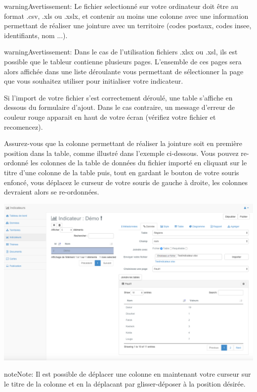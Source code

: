 \documentclass[letterpaper,10pt,french]{sphinxmanual}
\begin{document}
\begin{notice}{warning}{Avertissement:}
Le fichier selectionné sur votre ordinateur doit être au format
.csv, .xls ou .xslx, et contenir au moins une colonne avec une
information permettant de réaliser une jointure avec un territoire
(codes postaux, codes insee, identifiants, nom ...).
\end{notice}

\begin{notice}{warning}{Avertissement:}
Dans le cas de l'utilisation fichiers .xlsx ou .xsl, ils est
possible que le tableur contienne plusieurs pages. L'ensemble de
ces pages sera alors affichée dans une liste déroulante vous
permettant de sélectionner la page que vous souhaitez utiliser pour
initialiser votre indicateur.
\end{notice}

Si l'import de votre fichier s'est correctement déroulé, une table
s'affiche en dessous du formulaire d'ajout. Dans le cas contraire, un
message d'erreur de couleur rouge apparait en haut de votre écran
(vérifiez votre fichier et recomencez).

Assurez-vous que la colonne permettant de réaliser la jointure soit en
première position dans la table, comme illustré dans l'exemple
ci-dessous. Vous pouvez re-ordonné les colonnes de la table de données
du fichier importé en cliquant sur le titre d'une colonne de la table
puis, tout en gardant le bouton de votre souris enfoncé, vous déplacez
le curseur de votre souris de gauche à droite, les colonnes devraient
alors se re-ordonnées.

\includegraphics[width=1.000\linewidth]{indicator-data-table.png}

\begin{notice}{note}{Note:}
Il est possible de déplacer une colonne en maintenant votre curseur sur le titre de la colonne et en la déplacant par glisser-déposer à la position désirée.
\end{notice}
\end{document}
